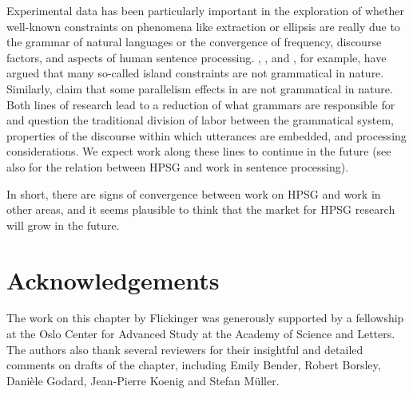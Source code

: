 \documentclass[output=paper
 	        ,biblatex
                ,babelshorthands
                ,newtxmath
                ,draftmode
                ,colorlinks, citecolor=brown
]{langscibook}
\begin{document}
Experimental data has been particularly important in the exploration of whether well-known
constraints on phenomena like extraction or ellipsis are really due to the grammar of natural
languages or the convergence of frequency, discourse factors, and aspects of human sentence
processing. \citet{HS2010a-u}, \citet{CD2019a-u}, and \citet{CP2020a-u}, for
example, have argued that many so-called island constraints are not grammatical in
nature. Similarly, \citet{SAHM2019a-u} claim that some parallelism
effects in  are not grammatical in nature. Both lines of research lead to a
reduction of what grammars are responsible for and question the traditional division of labor
between the grammatical system, properties of the discourse within which utterances are embedded,
and processing considerations. We expect work along these lines to continue in the future (see also
 for the relation between HPSG and work in sentence processing).
 
In short, there are signs of convergence between work on HPSG and work in other areas, and it seems
plausible to think that the market for HPSG research will grow in the future.

\section*{Acknowledgements}

The work on this chapter by Flickinger was generously supported by a fellowship at the Oslo Center for Advanced Study at the  Academy of Science and Letters.  The authors also thank several reviewers for their insightful and detailed comments on drafts of the chapter, including Emily  Bender, Robert Borsley, Danièle Godard, Jean-Pierre Koenig and Stefan Müller.


{\sloppy
\printbibliography[heading=subbibliography,notkeyword=this]
}
\end{document}

